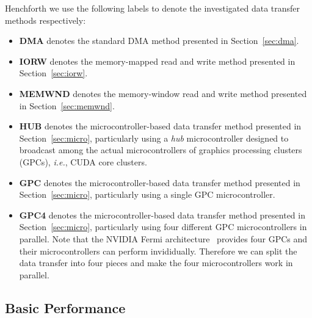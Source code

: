 Henchforth we use the following labels to denote the investigated data
transfer methods respectively:
\begin{itemize}
 \item \textbf{DMA} denotes the standard DMA method presented in
       Section~\ref{sec:dma}.
 \item \textbf{IORW} denotes the memory-mapped read and write method
       presented in Section~\ref{sec:iorw}.
 \item \textbf{MEMWND} denotes the memory-window read and write method
       presented in Section~\ref{sec:memwnd}.
 \item \textbf{HUB} denotes the microcontroller-based data transfer
       method presented in Section~\ref{sec:micro}, particularly using a
       \textit{hub} microcontroller designed to broadcast among the
       actual microcontrollers of graphics processing clusters (GPCs),
       \textit{i.e.}, CUDA core clusters.
 \item \textbf{GPC} denotes the microcontroller-based data transfer
       method presented in Section~\ref{sec:micro}, particularly using a
       single GPC microcontroller.
 \item \textbf{GPC4} denotes the microcontroller-based data transfer
       method presented in Section~\ref{sec:micro}, particularly using
       four different GPC microcontrollers in parallel.
       Note that the NVIDIA Fermi architecture~\cite{NVIDIA_Fermi}
       provides four GPCs and their microcontrollers can perform
       invididually.
       Therefore we can split the data transfer into four pieces and
       make the four microcontrollers work in parallel.
\end{itemize}

\subsection{Basic Performance}

